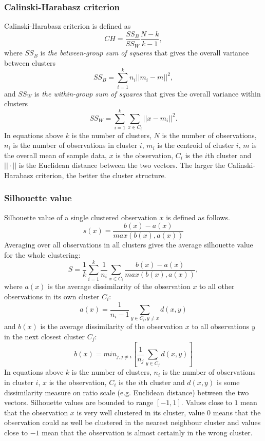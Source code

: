 \subsubsection{Calinski-Harabasz criterion}
Calinski-Harabasz criterion is defined as
\begin{equation}
 CH = \frac{SS_B}{SS_W} \frac{N-k}{k-1},
\end{equation}
where $SS_B$ is \emph{the between-group sum of squares} that gives
the overall variance between clusters
\begin{equation}
 SS_B = \sum_{i=1}^k n_i ||m_i-m||^2,
\end{equation}
and $SS_W$ is \emph{the within-group sum of squares} that gives 
the overall variance within clusters
\begin{equation}
 SS_W = \sum_{i=1}^k \sum_{x\in C_i} ||x-m_i||^2.
\end{equation}
In equations above $k$ is the number of clusters, $N$ is the 
number of observations, $n_i$ is the number of observations in 
cluster $i$, $m_i$ is the centroid of cluster $i$, $m$ is the 
overall mean of sample data, $x$ is the observation, $C_i$ is the 
$i$th cluster and $|| \cdot ||$ is the Euclidean 
distance between the two vectors. The larger the 
Calinski-Harabasz criterion, the better the cluster structure.

\subsubsection{Silhouette value}
Silhouette value of a single clustered observation $x$ is defined 
as follows.
\begin{equation}
 s(x) = \frac{b(x) - a(x)}{max(b(x), a(x))}
\end{equation}
Averaging over all observations in all clusters gives the average 
silhouette value for the whole clustering:
\begin{equation}
 S = \frac{1}{k}\sum_{i=1}^k \frac{1}{n_i}\sum_{x \in C_i}\frac{b(x) - a(x)}{max(b(x), a(x))},
\end{equation}
where $a(x)$ is the average dissimilarity of the observation $x$ 
to all other observations in its own cluster 
$C_i$:
\begin{equation}
  a(x) = \frac{1}{n_i - 1} \sum_{y \in C_i, y \neq x}d(x,y)  
\end{equation}
and $b(x)$ is the average dissimilarity of the observation $x$ to 
all observations $y$ in the next closest cluster $C_j$:
\begin{equation}
  b(x) = min_{j,j \neq i}[\frac{1}{n_j} \sum_{y \in C_j}d(x,y)]
\end{equation}
In equations above $k$ is the number of clusters, $n_i$ is the 
number of observations in cluster $i$, $x$ is the observation, 
$C_i$ is the $i$th cluster and $d(x,y)$ is some dissimilarity 
measure on ratio scale (e.g. Euclidean distance) between the two 
vectors. Silhouette values are bounded to range $[-1,1]$. Values
close to $1$ mean that the observation $x$ is very well clustered 
in its cluster, value $0$ means that the observation could as well
be clustered in the nearest neighbour cluster and values close to 
$-1$ mean that the observation is almost certainly in the wrong 
cluster.

